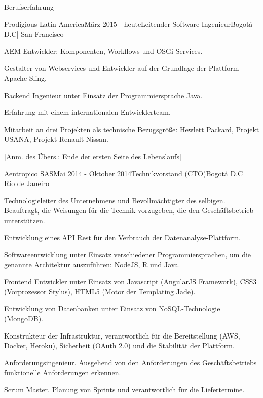 \documentclass[spanish]{resume} %
\begin{document}
\begin{rSection}{Berufserfahrung}

\begin{rSubsection}{Prodigious Latin America}{M{\"a}rz 2015 - heute}{Leitender Software-Ingenieur}{Bogot\'a D.C| San Francisco}
\item AEM Entwickler: Komponenten, Workflows und OSGi Services.
\item Gestalter von Webservices und Entwickler auf der Grundlage der Plattform Apache Sling.  
\item Backend Ingenieur unter Einsatz der Programmiersprache Java.
\item Erfahrung mit einem internationalen Entwicklerteam.
\item Mitarbeit an drei Projekten als technische Bezugsgröße: Hewlett Packard, Projekt USANA, Projekt Renault-Nissan.
\end{rSubsection}

[Anm. des Übers.: Ende der ersten Seite des Lebenslaufs]

\begin{rSubsection}{Aentropico SAS}{Mai 2014 - Oktober 2014}{Technikvorstand (CTO)}{Bogot\'a D.C | R\'io de Janeiro}
\item Technologieleiter des Unternehmens und Bevollm{\"a}chtigter des selbigen. Beauftragt, die Weisungen f{\"u}r die Technik vorzugeben, die den Gesch{\"a}ftsbetrieb unterst{\"u}tzen.
\item Entwicklung eines API Rest f{\"u}r den Verbrauch der Datenanalyse-Plattform.
\item Softwareentwicklung unter Einsatz verschiedener Programmiersprachen, um die genannte Architektur auszuf{\"u}hren: NodeJS, R und Java.
\item Frontend Entwickler unter Einsatz von Javascript (AngularJS Framework), CSS3 (Vorprozessor Stylus), HTML5 (Motor der Templating Jade).
\item Entwicklung von Datenbanken unter Einsatz von NoSQL-Technologie (MongoDB).
\item Konstrukteur der Infrastruktur, verantwortlich f{\"u}r die Bereitstellung (AWS, Docker, Heroku), Sicherheit (OAuth 2.0) und die Stabilität der Plattform.
\item Anforderungsingenieur. Ausgehend von den Anforderungen des Geschäftsbetriebs funktionelle Anforderungen erkennen.
\item Scrum Master. Planung von Sprints und verantwortlich für die Liefertermine.
\end{rSubsection}


\end{rSection}
\end{document}
